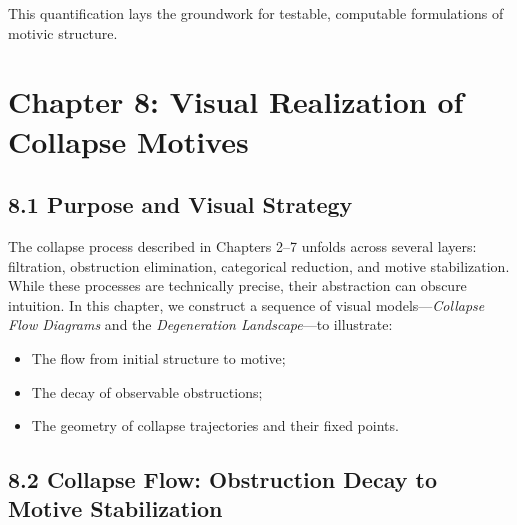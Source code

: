 \documentclass[11pt]{article}
\begin{document}
This quantification lays the groundwork for testable, computable formulations of motivic structure.

\FloatBarrier




\section{Chapter 8: Visual Realization of Collapse Motives}

\subsection{8.1 Purpose and Visual Strategy}

The collapse process described in Chapters 2–7 unfolds across several layers: filtration, obstruction elimination, categorical reduction, and motive stabilization. While these processes are technically precise, their abstraction can obscure intuition. In this chapter, we construct a sequence of visual models---\textit{Collapse Flow Diagrams} and the \textit{Degeneration Landscape}---to illustrate:

\begin{itemize}
    \item The flow from initial structure to motive;
    \item The decay of observable obstructions;
    \item The geometry of collapse trajectories and their fixed points.
\end{itemize}

\subsection{8.2 Collapse Flow: Obstruction Decay to Motive Stabilization}

\vspace{0.5em}
\begin{center}
\end{center}
\vspace{0.5em}
\end{document}
